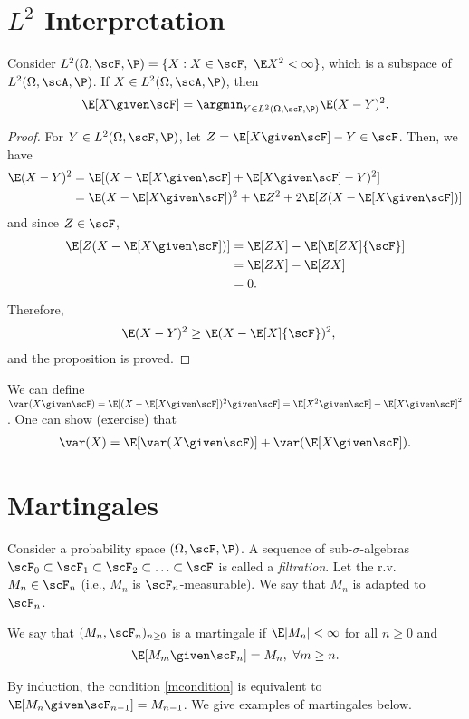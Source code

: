 \documentclass[../aipt.tex]{subfiles}
\begin{document}
\section{\texorpdfstring{$L^2$}{L2} Interpretation}

\begin{Proposition}
Consider $L^2(\Omega,\scF,\P)=\{X : X \in \scF,\ \E X^2 <\infty\}$, which is a subspace of $L^2(\Omega,\scA,\P)$. If $X\in L^2(\Omega,\scA,\P)$, then 
\begin{align*}
\E[X \given \scF] = \argmin_{Y\in L^2(\Omega,\scF,\P)} \E(X-Y)^2.
\end{align*}
\end{Proposition}
\begin{proof}
For $Y\in L^2(\Omega,\scF,\P)$, let $Z=\E[X \given \scF]-Y \in \scF$. Then, we have
\begin{align*}
\E(X-Y)^2
&=\E[(X-{\E[X \given \scF]}+{\E[X \given \scF]}-Y)^2]\\
&=\E(X-{\E[X \given \scF]})^2+ \E Z^2 + 2\E[Z(X-{\E[X \given \scF]})]
\end{align*}
and since $Z\in\scF$,
\begin{align*}
\E[Z(X-{\E[X \given \scF]})]
&=\E[ZX] - \E[\E[ZX]{\scF}]\\
&=\E[ZX] - \E[ZX]\\
&=0.
\end{align*}
Therefore,
\begin{align*}
\E(X-Y)^2 &\geq \E(X-\E[X]{\scF})^2,
\end{align*}
and the proposition is proved.
\end{proof}
We can define $\var(X \given \scF) = \E[(X-{\E[X \given \scF]})^2 \given \scF] = \E[X^2 \given \scF] - \E[X \given \scF]^2$. One can show (exercise) that
\begin{align*}
\var(X) = \E[\var(X \given \scF)] + \var(\E[X \given \scF]).
\end{align*}

\section{Martingales}
Consider a probability space $(\Omega,\scF,\P)$. A sequence of sub-$\sigma$-algebras $\scF_0\subset \scF_1\subset \scF_2\subset \ldots \subset \scF$ is called a \emph{filtration}. Let the r.v.\ $M_n\in \scF_n$ (i.e., $M_n$ is $\scF_n$-measurable). We say that $M_n$ is adapted to $\scF_n$. 
	
\begin{Definition}[Martingale]\label{wk12:Martingale} 
We say that $(M_n,\scF_n)_{n\geq 0}$ is a martingale if $\E|M_n|<\infty$ for all $n\geq0$ and
\begin{align}\label{mcondition}
\E[M_m \given \scF_n]=M_n,\ \forall m\geq n.
\end{align}
\end{Definition}
By induction, the condition \cref{mcondition} is equivalent to $\E[M_n \given \scF_{n-1}] = M_{n-1}$. We give examples of martingales below.
\end{document}
